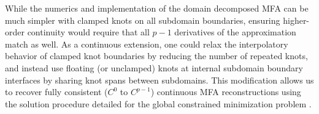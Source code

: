 While the numerics and implementation of the domain decomposed MFA can be much simpler with clamped knots on all subdomain boundaries, ensuring higher-order continuity would require that all $p-1$ derivatives of the approximation match as well. As a continuous extension, one could relax the interpolatory behavior of clamped knot boundaries by reducing the number of repeated knots, and instead use floating (or unclamped) knots at internal subdomain boundary interfaces by sharing knot spans between subdomains. This modification allows us to recover fully consistent ($C^0$ to $C^{p-1}$) continuous MFA reconstructions using the solution procedure detailed for the global constrained minimization problem .




